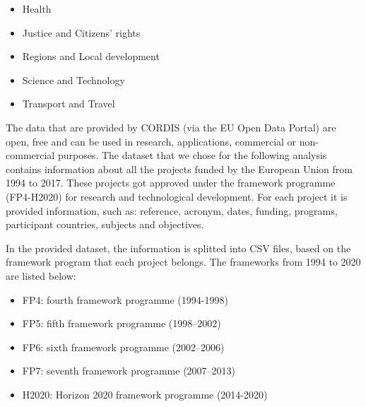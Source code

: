 \documentclass[12pt]{report}
\begin{document}
\begin{itemize}
\item Health
\item Justice and Citizens' rights
\item Regions and Local development
\item Science and Technology
\item Transport and Travel
\end{itemize}

The data that are provided by CORDIS (via the EU Open Data Portal) are open,
free and can be used in research, applications, commercial or non-commercial
purposes. The dataset that we chose for the following analysis contains
information about all the projects funded by the European Union from 1994 to
2017. These projects got approved under the framework programme (FP4-H2020) for
research and technological development. For each project it is provided
information, such as: reference, acronym, dates, funding, programs,
participant countries, subjects and objectives.

In the provided dataset, the information is splitted into CSV files, based on
the framework program that each project belongs. The frameworks from 1994 to
2020 are listed below:

\begin{itemize}
\item FP4: fourth framework programme (1994-1998)
\item FP5: fifth framework programme (1998–2002)
\item FP6: sixth framework programme (2002–2006)
\item FP7: seventh framework programme (2007–2013)
\item H2020: Horizon 2020 framework programme (2014-2020)
\end{itemize}
\end{document}

